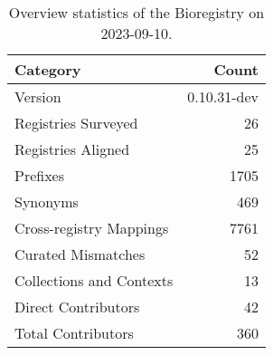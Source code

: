\begin{table}
\caption{Overview statistics of the Bioregistry on 2023-09-10.}
\label{tab:bioregistry-summary}
\begin{tabular}{lr}
\toprule
Category & Count \\
\midrule
Version & 0.10.31-dev \\
Registries Surveyed & 26 \\
Registries Aligned & 25 \\
Prefixes & 1705 \\
Synonyms & 469 \\
Cross-registry Mappings & 7761 \\
Curated Mismatches & 52 \\
Collections and Contexts & 13 \\
Direct Contributors & 42 \\
Total Contributors & 360 \\
\bottomrule
\end{tabular}
\end{table}
